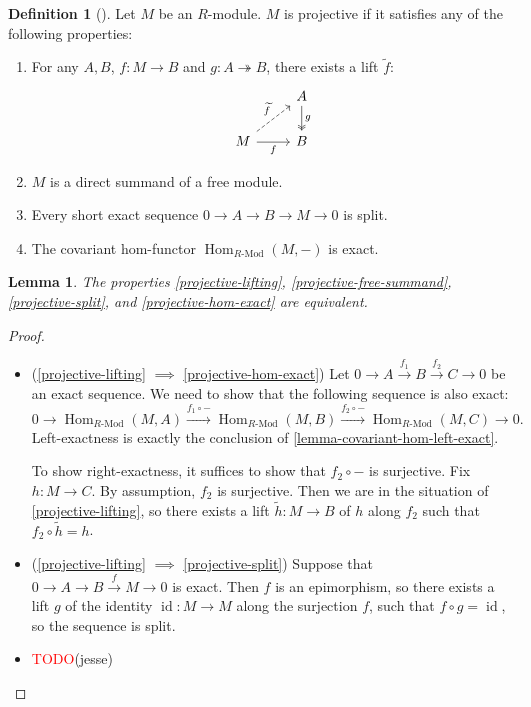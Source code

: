 \documentclass[11pt]{article}
\newcommand{\remph}[1]{\textcolor{red}{#1}}
\newcommand{\TODO}{\remph{TODO}}
\newcommand{\Hom}{\operatorname{Hom}}
\newcommand{\RHom}[3]{\Hom_{{#1}\text{-Mod}}({#2}, {#3})}
\newcommand{\wt}{\widetilde}
\theoremstyle{plain}
\newtheorem{lemma}{Lemma}[section]
\theoremstyle{definition}
\newtheorem{definition}{Definition}[section]
\begin{document}
  \begin{definition}[\cite{nlab:projective_module}]\label{def-projective}
  Let \(M\) be an \(R\)-module. \(M\) is projective if it satisfies any of the following properties:

  \begin{enumerate}
  \item\label{projective-lifting} For any \(A, B\), \(f : M \to B\) and \(g : A \twoheadrightarrow B\), there exists a lift \(\widetilde{f}\):
    \[
      \begin{tikzcd}
        & A \arrow[two heads]{d}{g}\\
        M \arrow[dashed]{ur}{\widetilde{f}}\arrow[swap]{r}{f}& B
      \end{tikzcd}
    \]
  \item \label{projective-free-summand} \(M\) is a direct summand of a free module.

    \item \label{projective-split} Every short exact sequence \(0 \to A \to B \to M \to 0\) is split.

    \item \label{projective-hom-exact} The covariant hom-functor \(\Hom_{R\text{-Mod}}(M, -)\) is exact.
  \end{enumerate}
\end{definition}

\begin{lemma}\label{lemma-projective-equivalent}
  The properties \ref{projective-lifting}, \ref{projective-free-summand}, \ref{projective-split}, and \ref{projective-hom-exact} are equivalent.
\end{lemma}
\begin{proof}
  \begin{itemize}
  \item (\ref{projective-lifting} \(\implies\) \ref{projective-hom-exact})
    Let \(0 \to A \overset{f_1}{\to} B \overset{f_2}{\to} C \to 0\) be an exact sequence. We need to show that the following sequence is also exact:
    \[0 \to \RHom{R}{M}{A} \overset{f_1 \circ -}{\to} \RHom{R}{M}{B} \overset{f_2 \circ -}{\to} \RHom{R}{M}{C} \to 0.\]
    Left-exactness is exactly the conclusion of \ref{lemma-covariant-hom-left-exact}.

    To show right-exactness, it suffices to show that \(f_2 \circ -\) is surjective. Fix \(h : M \to C\). By assumption, \(f_2\) is surjective. Then we are in the situation of \ref{projective-lifting}, so there exists a lift \(\wt{h} : M \to B\) of \(h\) along \(f_2\) such that \(f_2 \circ \wt{h} = h\).

    \item (\ref{projective-lifting} \(\implies\) \ref{projective-split}) Suppose that \(0 \to A \to B \overset{f}{\to} M \to 0\) is exact. Then \(f\) is an epimorphism, so there exists a lift \(g\) of the identity \(\operatorname{id} : M \to M\) along the surjection \(f\), such that \(f \circ g = \operatorname{id}\), so the sequence is split.
  \item \TODO(jesse)
  \end{itemize}
\end{proof}
\end{document}
